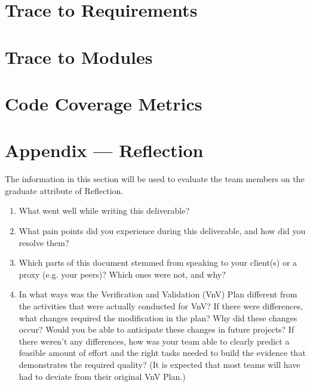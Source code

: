 \documentclass[12pt, titlepage]{article}
\begin{document}
\section{Trace to Requirements}
		
\section{Trace to Modules}		

\section{Code Coverage Metrics}




\newpage{}
\section*{Appendix --- Reflection}

The information in this section will be used to evaluate the team members on the
graduate attribute of Reflection.



\begin{enumerate}
  \item What went well while writing this deliverable? 
  \item What pain points did you experience during this deliverable, and how
    did you resolve them?
  \item Which parts of this document stemmed from speaking to your client(s) or
  a proxy (e.g. your peers)? Which ones were not, and why?
  \item In what ways was the Verification and Validation (VnV) Plan different
  from the activities that were actually conducted for VnV?  If there were
  differences, what changes required the modification in the plan?  Why did
  these changes occur?  Would you be able to anticipate these changes in future
  projects?  If there weren't any differences, how was your team able to clearly
  predict a feasible amount of effort and the right tasks needed to build the
  evidence that demonstrates the required quality?  (It is expected that most
  teams will have had to deviate from their original VnV Plan.)
\end{enumerate}
\end{document}
